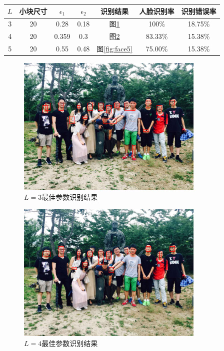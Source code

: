 \documentclass{article}
\numberwithin{figure}{section}
\numberwithin{table}{section}
\numberwithin{listing}{section}
\numberwithin{equation}{section}
\begin{document}
\begin{enumerate}
\begin{table}[H]
\begin{tabular}{|c|c|c|c|c|c|c|}
                    \hline
                    \textbf{$L$} & \textbf{小块尺寸} & \textbf{$\epsilon_1$} & \textbf{$\epsilon_2$} & \textbf{识别结果} & 人脸识别率 & 识别错误率 \\
                    \hline
                        3 & 20 & 0.28 & 0.18 & 图\ref{fig:face3} & 100\% & 18.75\% \\
                    \hline
                        4 & 20 & 0.359 & 0.3 & 图\ref{fig:face4} & 83.33\% & 15.38\% \\
                    \hline
                        5 & 20 & 0.55 & 0.48 & 图\ref{fig:face5} & 75.00\% & 15.38\% \\
                    \hline
                
                    \hline
                    \end{tabular}
                \end{table}

                \begin{figure}[H]
                    \centering
                    \includegraphics[width=0.8\textwidth]{photo_face3}
                    \caption{$L=3$最佳参数识别结果}
                    \label{fig:face3}
                \end{figure}

                \begin{figure}[H]
                    \centering
                    \includegraphics[width=0.8\textwidth]{photo_face4}
                    \caption{$L=4$最佳参数识别结果}
                    \label{fig:face4}
                \end{figure}


\end{enumerate}
\end{document}
